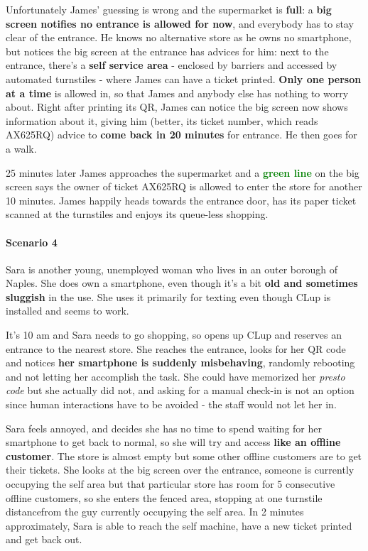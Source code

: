Unfortunately James' guessing is wrong and the supermarket is \textbf{full}: a \textbf{big screen notifies no entrance is allowed for now}, and everybody has to stay clear of the entrance. He knows no alternative store as he owns no smartphone, but notices the big screen at the entrance has advices for him: next to the entrance, there's a \textbf{self service area} - enclosed by barriers and accessed by automated turnstiles - where James can have a ticket printed. \textbf{Only one person at a time} is allowed in, so that James and anybody else has nothing to worry about.
\newline Right after printing its QR, James can notice the big screen now shows information about it, giving him (better, its ticket number, which reads AX625RQ) advice to \textbf{come back in 20 minutes} for entrance. He then goes for a walk.

25 minutes later James approaches the supermarket and a \textbf{\textcolor{green} {green line}} on the big screen says the owner of ticket AX625RQ is allowed to enter the store for another 10 minutes. 
\newline James happily heads towards the entrance door, has its paper ticket scanned at the turnstiles and enjoys its queue-less shopping.

\paragraph{Scenario 4}
Sara is another young, unemployed woman who lives in an outer borough of Naples. She does own a smartphone, even though it's a bit \textbf{old and sometimes sluggish} in the use. She uses it primarily for texting even though CLup is installed and seems to work.

It's 10 am and Sara needs to go shopping, so opens up CLup and reserves an entrance to the nearest store. She reaches the entrance, looks for her QR code and notices \textbf{her smartphone is suddenly misbehaving}, randomly rebooting and not letting her accomplish the task. \newline
She could have memorized her \textit{presto code} but she actually did not, and asking for a manual check-in is not an option since human interactions have to be avoided - the staff would not let her in.

Sara feels annoyed, and decides she has no time to spend waiting for her smartphone to get back to normal, so she will try and access \textbf{like an offline customer}. The store is almost empty but some other offline customers are to get their tickets. \newline
She looks at the big screen over the entrance, someone is currently occupying the self area but that particular store has room for 5 consecutive offline customers, so she enters the fenced area, stopping at \guillemotleft one turnstile distance\guillemotright \space from the guy currently occupying the self area. In 2 minutes approximately, Sara is able to reach the self machine, have a new ticket printed and get back out.

